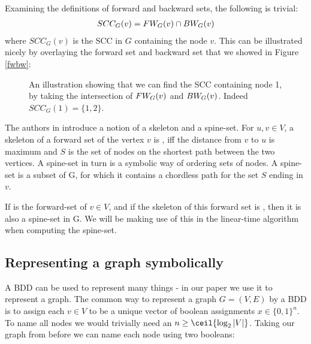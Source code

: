 \documentclass[../master/master.tex]{subfiles}
\begin{document}
\noindent Examining the definitions of forward and backward sets, the following is trivial:
\begin{align}
SCC_G(v) = FW_{G}(v) \cap BW_{G}(v) \label{scc}
\end{align} 
where $SCC_G(v)$ is the SCC in $G$ containing the node $v$. This can be illustrated nicely by overlaying the forward set and backward set that we showed in Figure \ref{fwbw}:


\begin{figure}[H]
\center
{}
\caption{An illustration showing that we can find the SCC containing node 1, by taking the intersection of $FW_{G}(v)$ and $BW_{G}(v)$. Indeed $SCC_G(1) = \{1,2\}$. } 
\end{figure}

The authors in \cite{linear} introduce a notion of a skeleton and a spine-set. For $u, v \in V$, a skeleton of a forward set of the vertex $v$  is , iff the distance from $v$ to $u$ is maximum and $S$ is the set of nodes on the shortest path between the two vertices.
A spine-set in turn is a symbolic way of ordering sets of nodes. A spine-set is a subset  of G, for which it contains a chordless path for the set $S$ ending in $v$.

If  is the forward-set of $v \in V$, and if the skeleton of this forward set is , then it is also a spine-set in G. We will be making use of this in the linear-time algorithm when computing the spine-set. 

\subsection{Representing a graph symbolically}
A BDD can be used to represent many things - in our paper we use it to represent a graph. The common way to represent a graph $G = (V, E)$ by a BDD is to assign each $v\in V$ to be a unique vector of boolean assignments $x\in\{0,1\}^n$. To name all nodes we would trivially need an $n \geq \ceil{\log_2{|V|}}$. Taking our graph from before we can name each node using two booleans:
\end{document}
